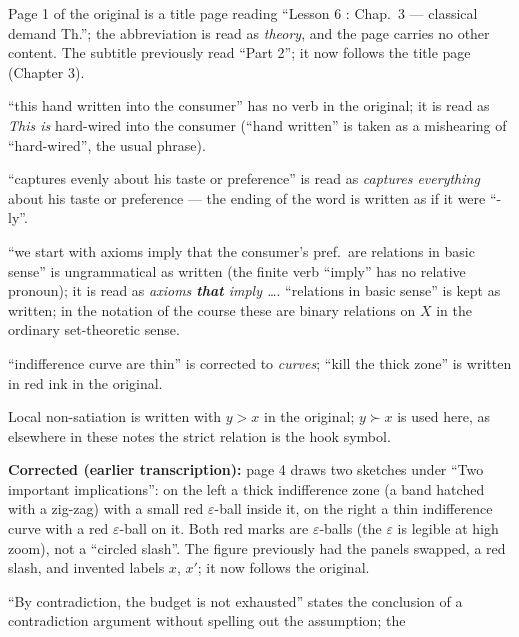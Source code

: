 \documentclass[11pt]{article}
\begin{document}
\begin{transcriptnotes}
  \item Page 1 of the original is a title page reading ``Lesson 6 : Chap.~3 ---
        classical demand Th.''; the abbreviation is read as \emph{theory}, and
        the page carries no other content. The subtitle previously read ``Part
        2''; it now follows the title page (Chapter 3).
  \item ``this hand written into the consumer'' has no verb in the original; it
        is read as \emph{This is} hard-wired into the consumer (``hand written''
        is taken as a mishearing of ``hard-wired'', the usual phrase).
  \item ``captures evenly about his taste or preference'' is read as
        \emph{captures everything} about his taste or preference --- the ending
        of the word is written as if it were ``-ly''.
  \item ``we start with axioms imply that the consumer's pref.\ are relations in
        basic sense'' is ungrammatical as written (the finite verb ``imply'' has
        no relative pronoun); it is read as \emph{axioms \textbf{that} imply
        \dots}. ``relations in basic sense'' is kept as written; in the notation
        of the course these are binary relations on $X$ in the ordinary
        set-theoretic sense.
  \item ``indifference curve are thin'' is corrected to \emph{curves}; ``kill the
        thick zone'' is written in red ink in the original.
  \item Local non-satiation is written with $y>x$ in the original; $y\succ x$ is
        used here, as elsewhere in these notes the strict relation is the hook
        symbol.
  \item \textbf{Corrected (earlier transcription):} page 4 draws two sketches
        under ``Two important implications'': on the left a thick indifference
        zone (a band hatched with a zig-zag) with a small red $\varepsilon$-ball
        inside it, on the right a thin indifference curve with a red
        $\varepsilon$-ball on it. Both red marks are $\varepsilon$-balls (the
        $\varepsilon$ is legible at high zoom), not a ``circled slash''. The
        figure previously had the panels swapped, a red slash, and invented
        labels $x$, $x'$; it now follows the original.
  \item ``By contradiction, the budget is not exhausted'' states the conclusion
        of a contradiction argument without spelling out the assumption; the

\end{transcriptnotes}
\end{document}
